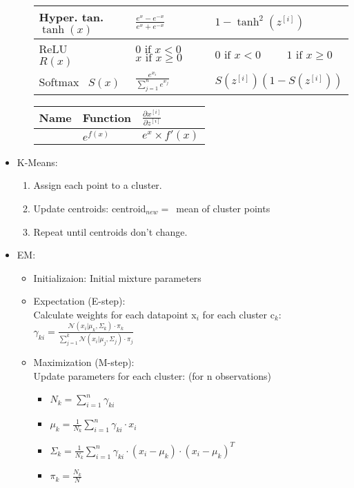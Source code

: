 \documentclass[twocolumn, 10pt]{article}
\begin{document}
\begin{itemize}[leftmargin=*, itemsep=0pt]
\begin{itemize}[topsep=0pt]
{\begin{tabular}{ | M{6em} | M{6em} | M{9em} | }
            Hyper. tan. $\tanh\left(x\right)$ & $\displaystyle \frac{e^x-e^{-x}}{e^x+e^{-x}}$ & $1-\tanh^2\left(z^{[i]}\right)$ \\\hline
            ReLU \ \ \ \ $R(x)$ & $0\mbox{ if }x<0$ $x\mbox{ if }x\geq 0$ & $0\mbox{ if }x<0$ \ \ \ \ $1\mbox{ if }x\geq 0$ \\\hline
            Softmax \ $S(x)$ & $\displaystyle \frac{e^{x_i}}{\sum_{j=1}^{n}e^{x_j}}$ & $S\left(z^{[i]}\right)\left(1-S\left(z^{[i]}\right)\right)$ \\\hline
        \end{tabular}}
        {\renewcommand{\arraystretch}{1.6}
        \begin{tabular}{ | M{6em} | M{6em} | M{9em} | } \hline
            Name & Function & $\displaystyle \frac{\partial x^{[i]}}{\partial z^{[i]}}$ \\\hline
            & $\displaystyle e^{f(x)}$ & $e^x\times f'(x)$ \\\hline
        \end{tabular}}
    \end{itemize}

    \item K-Means:
    \begin{enumerate}[topsep=0pt, itemsep=0pt]
        \item Assign each point to a cluster.
        \item Update centroids: centroid$_{new}=$\ mean of cluster points
        \item Repeat until centroids don't change.
    \end{enumerate}

    \item EM:
    \begin{itemize}[topsep=0pt]
        \item Initializaion: Initial mixture parameters
        \item Expectation (E-step): \\[2pt]
        Calculate weights for each datapoint x$_i$ for each cluster c$_k$: 
        $\displaystyle \gamma_{ki}=\frac{\mathcal{N}(x_i|\mu_k,\Sigma_k)\cdot\pi_k}{\sum_{j = 1}^{k}\mathcal{N}(x_{i}|\mu_{j},\Sigma_{j})\cdot\pi_{j}}$
        \item Maximization (M-step): \\[2pt]
        Update parameters for each cluster: (for n observations)
        \begin{itemize}
            \item $\displaystyle N_{k}={\sum_{i=1}^{n}\gamma_{ki}}$
            \item $\displaystyle \mu_{k}={\frac{1}{N_{k}}\sum_{i=1}^{n}\gamma_{ki}\cdot x_{i}}$
            \item $\displaystyle \Sigma_{k} = \frac{1}{N_{k}}\sum_{i=1}^{n}\gamma_{ki} \cdot (x_{i} - \mu_{k}) \cdot (x_{i} - \mu_{k})^T$
            \item $\displaystyle \pi_{k}={\frac{N_{k}}{N}}$
        \end{itemize}
    \end{itemize}

\end{itemize}
\end{document}
